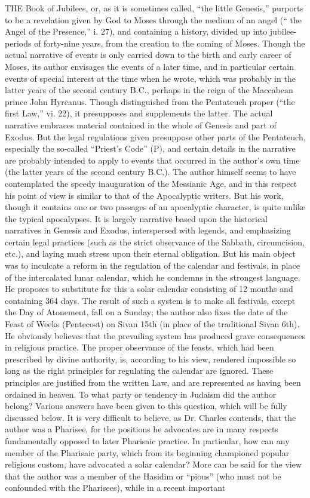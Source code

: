 THE Book of Jubilees, or, as it is sometimes called, ``the little Genesis,'' purports to be a revelation given by God to Moses through the medium of an angel (`` the Angel of the Presence,'' i. 27), and containing a history, divided up into jubilee-periods of forty-nine years, from the creation to the coming of Moses. Though the actual narrative of events is only carried down to the birth and early career of Moses, its author envisages the events of a later time, and in particular certain events of special interest at the time when he wrote, which was probably in the latter years of the second century B.C., perhaps in the reign of the Maccabean prince John Hyrcanus. Though distinguished from the Pentateuch proper (``the first Law,'' vi. 22), it presupposes and supplements the latter. The actual narrative embraces material contained in the whole of Genesis and part of Exodus. But the legal regulations given presuppose other parts of the Pentateuch, especially the so-called ``Priest's Code'' (P), and certain details in the narrative are probably intended to apply to events that occurred in the author's own time (the latter years of the second century B.C.). The author himself seems to have contemplated the speedy inauguration of the Messianic Age, and in this respect his point of view is similar to that of the Apocalyptic writers. But his work, though it contains one or two passages of an apocalyptic character, is quite unlike the typical apocalypses. It is largely narrative based upon the historical narratives in Genesis and Exodus, interspersed with legends, and emphasizing certain legal practices (such as the strict observance of the Sabbath, circumcision, etc.), and laying much stress upon their eternal obligation. But his main object was to inculcate a reform in the regulation of the calendar and festivals, in place of the intercalated lunar calendar, which he condemns in the strongest language. He proposes to substitute for this a solar calendar consisting of 12 months and containing 364 days. The result of such a system is to make all festivals, except the Day of Atonement, fall on a Sunday; the author also fixes the date of the Feast of Weeks (Pentecost) on Sivan 15th (in place of the traditional Sivan 6th). He obviously believes that the prevailing system has produced grave consequences in religious practice. The proper observance of the feasts, which had been prescribed by divine authority, is, according to his view, rendered impossible so long as the right principles for regulating the calendar are ignored. These principles are justified from the written Law, and are represented as having been ordained in heaven. To what party or tendency in Judaism did the author belong? Various answers have been given to this question, which will be fully discussed below. It is very difficult to believe, as Dr. Charles contends, that the author was a Pharisee, for the positions he advocates are in many respects fundamentally opposed to later Pharisaic practice. In particular, how can any member of the Pharisaic party, which from its beginning championed popular religious custom, have advocated a solar calendar? More can be said for the view that the author was a member of the Hasidim or ``pious'' (who must not be confounded with the Pharisees), while in a recent important 